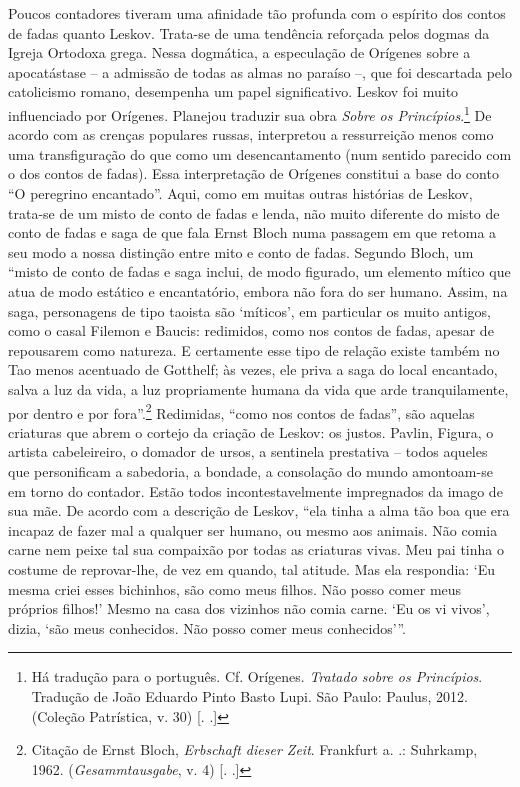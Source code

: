 Poucos contadores tiveram uma afinidade tão profunda com o espírito dos
contos de fadas quanto Leskov. Trata-se de uma tendência reforçada pelos
dogmas da Igreja Ortodoxa grega. Nessa dogmática, a especulação de
Orígenes sobre a apocatástase -- a admissão de todas as almas no paraíso
--, que foi descartada pelo catolicismo romano, desempenha um papel
significativo. Leskov foi muito influenciado por Orígenes. Planejou
traduzir sua obra \emph{Sobre os Princípios}.\footnote{Há tradução para
  o português. Cf. Orígenes. \emph{Tratado sobre os Princípios}.
  Tradução de João Eduardo Pinto Basto Lupi. São Paulo: Paulus, 2012.
  (Coleção Patrística, v. 30) [. .]} De acordo com as
crenças populares russas, interpretou a ressurreição menos como uma
transfiguração do que como um desencantamento (num sentido parecido com
o dos contos de fadas). Essa interpretação de Orígenes constitui a base
do conto ``O peregrino encantado''. Aqui, como em muitas outras
histórias de Leskov, trata-se de um misto de conto de fadas e lenda, não
muito diferente do misto de conto de fadas e saga de que fala Ernst
Bloch numa passagem em que retoma a seu modo a nossa distinção entre
mito e conto de fadas. Segundo Bloch, um ``misto de conto de fadas e
saga inclui, de modo figurado, um elemento mítico que atua de modo
estático e encantatório, embora não fora do ser humano. Assim, na saga,
personagens de tipo taoista são `míticos', em particular os muito
antigos, como o casal Filemon e Baucis: redimidos, como nos contos de
fadas, apesar de repousarem como natureza. E certamente esse tipo de
relação existe também no Tao menos acentuado de Gotthelf; às vezes, ele
priva a saga do local encantado, salva a luz da vida, a luz propriamente
humana da vida que arde tranquilamente, por dentro e por
fora''.\footnote{Citação de Ernst Bloch, \emph{Erbschaft dieser Zeit}.
  Frankfurt a. .: Suhrkamp, 1962. (\emph{Gesammtausgabe}, v. 4) [.
  .]} Redimidas, ``como nos contos de fadas'', são aquelas
criaturas que abrem o cortejo da criação de Leskov: os justos. Pavlin,
Figura, o artista cabeleireiro, o domador de ursos, a sentinela
prestativa -- todos aqueles que personificam a sabedoria, a bondade, a
consolação do mundo amontoam-se em torno do contador. Estão todos
incontestavelmente impregnados da imago de sua mãe. De acordo com a
descrição de Leskov, ``ela tinha a alma tão boa que era incapaz de fazer
mal a qualquer ser humano, ou mesmo aos animais. Não comia carne nem
peixe tal sua compaixão por todas as criaturas vivas. Meu pai tinha o
costume de reprovar-lhe, de vez em quando, tal atitude. Mas ela
respondia: `Eu mesma criei esses bichinhos, são como meus filhos. Não
posso comer meus próprios filhos!' Mesmo na casa dos vizinhos não comia
carne. `Eu os vi vivos', dizia, `são meus conhecidos. Não posso comer
meus conhecidos'''.

